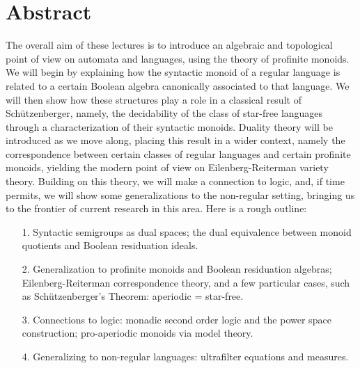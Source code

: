 \section*{Abstract}
The overall aim of these lectures is to introduce an algebraic and topological point of view on automata and languages, using the theory of profinite monoids. We will begin by explaining how the syntactic monoid of a regular language is related to a certain Boolean algebra canonically associated to that language. We will then show how these structures play a role in a classical result of Schützenberger, namely, the decidability of the class of star-free languages through a characterization of their syntactic monoids. Duality theory will be introduced as we move along, placing this result in a wider context, namely the correspondence between certain classes of regular languages and certain profinite monoids, yielding the modern point of view on Eilenberg-Reiterman variety theory. Building on this theory, we will make a connection to logic, and, if time permits, we will show some generalizations to the non-regular setting, bringing us to the frontier of current research in this area. Here is a rough outline:
\begin{enumerate}
\item[1.]  Syntactic semigroups as dual spaces; the dual equivalence between monoid quotients and Boolean residuation ideals.
\item[2.]   Generalization to profinite monoids and Boolean residuation algebras; Eilenberg-Reiterman correspondence theory, and a few particular cases, such as Schützenberger's Theorem: aperiodic = star-free.
\item[3.]    Connections to logic: monadic second order logic and the power space construction; pro-aperiodic monoids via model theory.
\item[4.]   Generalizing to non-regular languages: ultrafilter equations and measures.
\end{enumerate}


